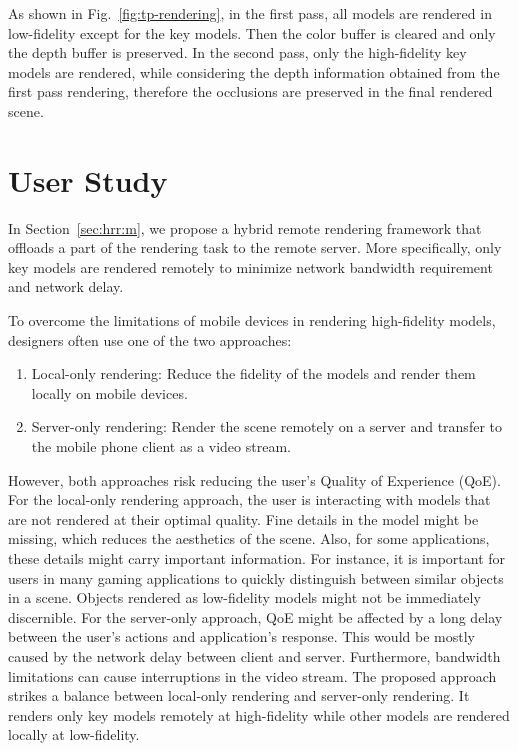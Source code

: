 As shown in Fig.~\ref{fig:tp-rendering}, in the first pass, all models are rendered in low-fidelity except for the key models. Then the color buffer is cleared and only the depth buffer is preserved. In the second pass, only the high-fidelity key models are rendered, while considering the depth information obtained from the first pass rendering, therefore the occlusions are preserved in the final rendered scene.

\section{User Study}
\label{sec:us}

In Section~\ref{sec:hrr:m}, we propose a hybrid remote rendering framework that offloads a part of the rendering task to the remote server. More specifically, only key models are rendered remotely to minimize network bandwidth requirement and network delay.

To overcome the limitations of mobile devices in rendering high-fidelity models, designers often use one of the two approaches:
\begin{enumerate}
\item
Local-only rendering: Reduce the fidelity of the models and render them locally on mobile devices.
\item
Server-only rendering: Render the scene remotely on a server and transfer to the mobile phone client as a video stream.
\end{enumerate}

However, both approaches risk reducing the user's Quality of Experience (QoE). For the local-only rendering approach, the user is interacting with models that are not rendered at their optimal quality. Fine details in the model might be missing, which reduces the aesthetics of the scene. Also, for some applications, these details might carry important information. For instance, it is important for users in many gaming applications to quickly distinguish between similar objects in a scene. Objects rendered as low-fidelity models might not be immediately discernible. For the server-only approach, QoE might be affected by a long delay between the user's actions and application's response. This would be mostly caused by the network delay between client and server. Furthermore, bandwidth limitations can cause interruptions in the video stream.
The proposed approach strikes a balance between local-only rendering and server-only rendering. It renders only key models remotely at high-fidelity while other models are rendered locally at low-fidelity. 

